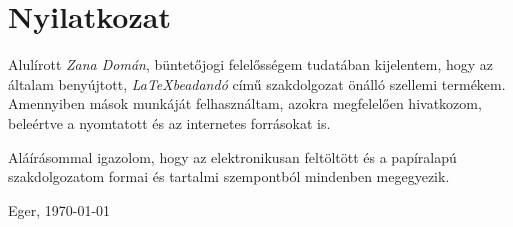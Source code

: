 \documentclass{thesis-ekf}
\begin{document}
\chapter*{Nyilatkozat}

Alulírott \emph{Zana Domán}, büntetőjogi felelősségem tudatában kijelentem, hogy az általam benyújtott, \emph{\LaTeX beadandó} című szakdolgozat önálló szellemi termékem. Amennyiben mások munkáját felhasználtam, azokra megfelelően hivatkozom, beleértve a nyomtatott és az internetes forrásokat is.

Aláírásommal igazolom, hogy az elektronikusan feltöltött és a papíralapú szakdolgozatom formai és tartalmi szempontból mindenben megegyezik.

\bigskip
\begin{flushleft}
Eger, \today
\end{flushleft}

\medskip
\begin{flushright}
\end{flushright}

%
\end{document}
